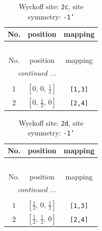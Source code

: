 \documentclass[fleqn,8pt]{jsarticle}
\begin{document}
\begin{longtable}{ccc}
\caption{Wyckoff site: {\tt 2c}, site symmetry: {\tt -1'}}
 \\
 \hline \hline
No. & position & mapping \\ \hline \endfirsthead

\multicolumn{2}{l}{\tablename\ \thetable{}} \\
 \hline \hline
No. & position & mapping \\ \hline \endhead

 \hline \hline
\multicolumn{2}{r}{\footnotesize\it continued ...} \\ \endfoot

 \hline \hline
\multicolumn{2}{r}{} \\ \endlastfoot

1 & $\left[ 0,\, 0,\, \frac{1}{2} \right]$ & {\tt [1,3]} \\ \hline
2 & $\left[ 0,\, \frac{1}{2},\, 0 \right]$ & {\tt [2,4]} \\
\end{longtable}
\renewcommand{\arraystretch}{1.2}
\begin{longtable}{ccc}
\caption{Wyckoff site: {\tt 2d}, site symmetry: {\tt -1'}}
 \\
 \hline \hline
No. & position & mapping \\ \hline \endfirsthead

\multicolumn{2}{l}{\tablename\ \thetable{}} \\
 \hline \hline
No. & position & mapping \\ \hline \endhead

 \hline \hline
\multicolumn{2}{r}{\footnotesize\it continued ...} \\ \endfoot

 \hline \hline
\multicolumn{2}{r}{} \\ \endlastfoot

1 & $\left[ \frac{1}{2},\, 0,\, \frac{1}{2} \right]$ & {\tt [1,3]} \\ \hline
2 & $\left[ \frac{1}{2},\, \frac{1}{2},\, 0 \right]$ & {\tt [2,4]} \\
\end{longtable}
\renewcommand{\arraystretch}{1.2}
\end{document}
